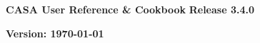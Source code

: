 \pagestyle{empty}

\begin{center}
\Huge
{\bf CASA User Reference \& Cookbook} 
\break 
\break 
\huge
{\bf Release 3.4.0}
\break 
\end{center}
\normalsize
\vspace{2.5cm}
\begin{figure}[h!]
\begin{center}
\end{center}
\end{figure}


\Large
\vfill
\begin{center}
{\bf Version: \today}
\end{center}
\normalsize

\pagebreak
